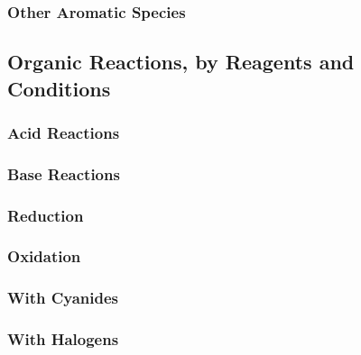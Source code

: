 \documentclass[../main]{subfiles}
\begin{document}
		\subsubsection{Other Aromatic Species}

	\subsection{Organic Reactions, by Reagents and Conditions}

		\subsubsection{Acid Reactions}
		\subsubsection{Base Reactions}

		\subsubsection{Reduction}
		\subsubsection{Oxidation}

		\subsubsection{With Cyanides}
		\subsubsection{With Halogens}
	
\end{document}
